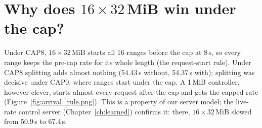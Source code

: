 \section{Why does $16\times32$\,MiB win under the cap?}
Under CAP8, $16\times32$\,MiB starts all 16 ranges before the cap at 8\,s, so every range keeps the pre-cap rate for its whole length (the request-start rule). Under CAP8 splitting adds almost nothing (54.43\,s without, 54.37\,s with); splitting was decisive under CAP0, where ranges start under the cap. A 1\,MiB controller, however clever, starts almost every request after the cap and gets the capped rate (Figure~\ref{fig:arrival_rule.png}). This is a property of our server model; the live-rate control server (Chapter~\ref{ch:learned}) confirms it: there, $16\times32$\,MiB slowed from 50.9\,s to 67.4\,s.
